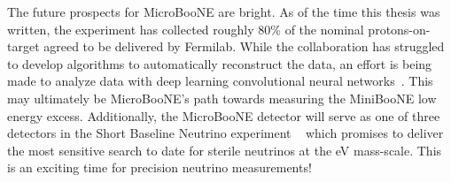The future prospects for MicroBooNE are bright. As of the time this thesis was written, the experiment has collected roughly 80\% of the nominal protons-on-target agreed to be delivered by Fermilab. While the collaboration has struggled to develop algorithms to automatically reconstruct the data, an effort is being made to analyze data with deep learning convolutional neural networks~\cite{UBCNNsource}. This may ultimately be MicroBooNE's path towards measuring the MiniBooNE low energy excess. Additionally, the MicroBooNE detector will serve as one of three detectors in the Short Baseline Neutrino experiment ~\cite{SBNproposal} which promises to deliver the most sensitive search to date for sterile neutrinos at the eV mass-scale. This is an exciting time for precision neutrino measurements!